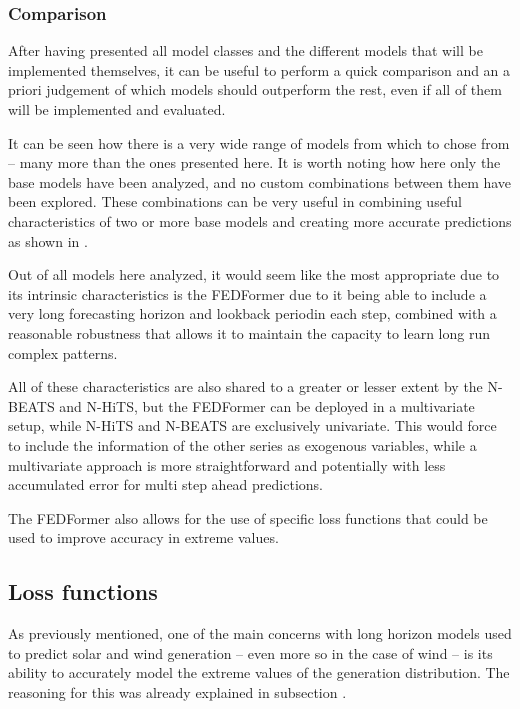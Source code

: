 \subsubsection{Comparison}
After having presented all model classes and the different models that will be implemented themselves, it can be useful to perform a quick comparison and an a priori judgement of which models should outperform the rest, even if all of them will be implemented and evaluated. 

It can be seen how there is a very wide range of models from which to chose from -- many more than the ones presented here. It is worth noting how here only the base models have been analyzed, and no custom combinations between them have been explored. These combinations can be very useful in combining useful characteristics of two or more base models and creating more accurate predictions as shown in \cite{zou_yang_2004}.

Out of all models here analyzed, it would seem like the most appropriate due to its intrinsic characteristics is the FEDFormer due to it being able to include a very long forecasting horizon and lookback periodin each step, combined with a reasonable robustness that allows it to maintain the capacity to learn long run complex patterns.

All of these characteristics are also shared to a greater or lesser extent by the N-BEATS and N-HiTS, but the FEDFormer can be deployed in a multivariate setup, while N-HiTS and N-BEATS are exclusively univariate. This would force to include the information of the other series as exogenous variables, while a multivariate approach is more straightforward and potentially with less accumulated error for multi step ahead predictions.  

The FEDFormer also allows for the use of specific loss functions that could be used to improve accuracy in extreme values. 

\subsection{Loss functions}
\label{s:loss-functions}
As previously mentioned, one of the main concerns with long horizon models used to predict solar and wind generation -- even more so in the case of wind -- is its ability to accurately model the extreme values of the generation distribution. The reasoning for this was already explained in  subsection . 

